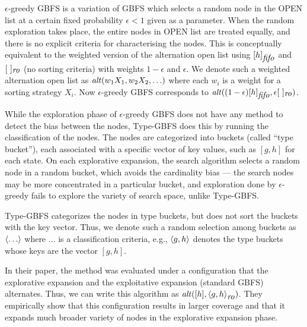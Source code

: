 $\epsilon$-greedy GBFS \cite{valenzano2014comparison} is a variation of GBFS
which selects a random node in the OPEN list at a certain fixed
probability $\epsilon <1$ given as a parameter. When the random
exploration takes place, the entire nodes in OPEN list are treated equally, and
there is no explicit criteria for characterising the nodes.
This is conceptually equivalent to the weighted version of the alternation
open list using $[h]_{\fifo}$ and $[\ ]_{\ro}$ (no sorting criteria) with weights
$1-\epsilon$ and $\epsilon$. We denote such a weighted alternation open
list as $\mit{alt}(w_1X_1,w_2X_2,\ldots)$ where each $w_i$ is a weight
for a sorting strategy $X_i$. Now $\epsilon$-greedy GBFS corresponds to
$\mit{alt}((1-\epsilon)[h]_{\fifo},\epsilon [\ ]_{\ro})$.

While the exploration phase of $\epsilon$-greedy GBFS does not have any method to detect the bias
between the nodes,
Type-GBFS \cite{xie14type} does this by running the 
classification of the nodes. The nodes are categorized into buckets
(called ``type bucket''), each associated with a specific vector of key
values, such as $[g,h]$ for each state. On each explorative
expansion, the search algorithm selects a random node in a random
bucket, which avoids the cardinality bias --- the search nodes
may be more concentrated in a particular bucket, and exploration done by
$\epsilon$-greedy fails to explore the variety of search space, unlike
Type-GBFS.

Type-GBFS categorizes the nodes in type buckets, but does not sort the
buckets with the key vector. Thus, we denote such a random
selection among buckets as $\brackets{\ldots}$ where $\ldots$ is a
classification criteria, e.g., $\brackets{g,h}$ denotes the type buckets
whose keys are the vector $[g,h]$.

In their paper, the method was evaluated under a
configuration that the explorative expansion and the exploitative
expansion (standard GBFS) alternates. 
Thus, we can write this algorithm as $\mit{alt}([h], \brackets{g,h}_{\ro})$.
% 
They empirically show that
this configuration results in larger coverage and that it
expands much broader variety of nodes in the explorative
expansion phase.

